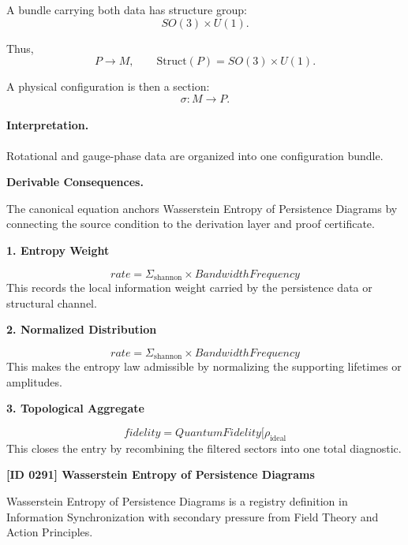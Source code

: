 A bundle carrying both data has structure group:
\begin{equation}
SO(3)\times U(1).
\end{equation}

Thus,
\begin{equation}
P\to M,
\qquad
\mathrm{Struct}(P)=SO(3)\times U(1).
\end{equation}

A physical configuration is then a section:
\begin{equation}
\boxed{
\sigma:M\to P.
}
\end{equation}

\paragraph{Interpretation.}
Rotational and gauge-phase data are organized into one configuration bundle.

\par\vspace{0.35em}
\noindent\textbf{Derivable Consequences.}\quad
\begingroup
\footnotesize
\raggedright
The canonical equation anchors Wasserstein Entropy of Persistence Diagrams by connecting the source condition to the derivation layer and proof certificate.
\par\endgroup

\noindent\textbf{1. Entropy Weight}\par
\[
rate = \Sigma_{\mathrm{shannon}} \times BandwidthFrequency
\]
\noindent This records the local information weight carried by the persistence data or structural channel.\par
\noindent\textbf{2. Normalized Distribution}\par
\[
rate = \Sigma_{\mathrm{shannon}} \times BandwidthFrequency
\]
\noindent This makes the entropy law admissible by normalizing the supporting lifetimes or amplitudes.\par
\noindent\textbf{3. Topological Aggregate}\par
\[
fidelity = QuantumFidelity[\rho_{\mathrm{ideal}}
\]
\noindent This closes the entry by recombining the filtered sectors into one total diagnostic.\par

\clearpage
\noindent\textbf{[ID 0291] Wasserstein Entropy of Persistence Diagrams}\par
\vspace{0.35em}
\begingroup\small
{}
Wasserstein Entropy of Persistence Diagrams is a registry definition in Information Synchronization with secondary pressure from Field Theory and Action Principles.

